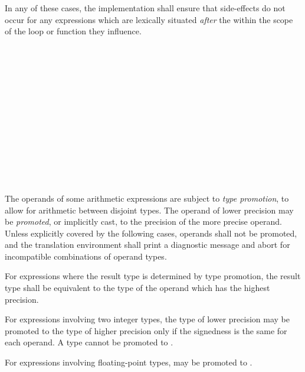 \specsubsubitem
In any of these cases, the implementation shall ensure that side-effects do not
occur for any expressions which are lexically situated \textit{after} the
 within the scope of the loop or function they
influence.


\begin{grammar}
 \\
	 \\
	 \\
	 \\
	 \\
	 \\
	 \\
	 \\
	 \\
	 \\

 \\
	\terminal{\{}  \terminal{\}} \\
\end{grammar}


\specsubitem
The operands of some arithmetic expressions are subject to \textit{type
promotion}, to allow for arithmetic between disjoint types. The operand of
lower precision may be \textit{promoted}, or implicitly cast, to the precision
of the more precise operand. Unless explicitly covered by the following cases,
operands shall not be promoted, and the translation environment shall print a
diagnostic message and abort for incompatible combinations of operand types.

\specsubitem
For expressions where the result type is determined by type promotion, the
result type shall be equivalent to the type of the operand which has the
highest precision.

\specsubitem
For expressions involving two integer types, the type of lower precision may be
promoted to the type of higher precision only if the signedness is the same for
each operand. A type cannot be promoted to .

\specsubitem
For expressions involving floating-point types,  may be promoted
to .

